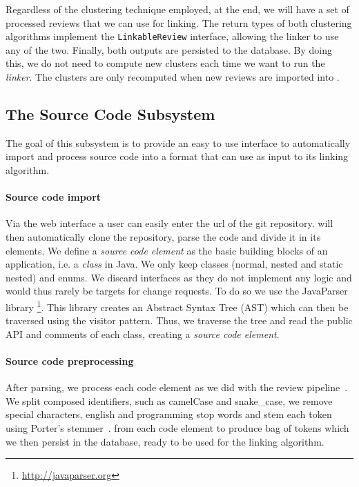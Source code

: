 Regardless of the clustering technique employed, at the end, we will have a set of processed reviews that we can use for linking. The return types of both clustering algorithms implement the \texttt{LinkableReview} interface, allowing the linker to use any of the two. Finally, both outputs are persisted to the database. By doing this, we do not need to compute new clusters each time we want to run the \textit{linker}. The clusters are only recomputed when new reviews are imported into \tool{}.

%
%
\subsection{The Source Code Subsystem}

The goal of this subsystem is to provide an easy to use interface to automatically import and process source code into a format that \tool{} can use as input to its linking algorithm. 
\paragraph{Source code import} 
Via the web interface a user can easily enter the url of the git repository. \tool{} will then automatically clone the repository, parse the code and divide it in its elements. We define a \textit{source code element} as the basic building blocks of an application, i.e. a \textit{class} in Java. We only keep classes (normal, nested and static nested) and enums. We discard interfaces as they do not implement any logic and would thus rarely be targets for change requests. To do so we use the JavaParser library \footnote{\url{http://javaparser.org}}. This library creates an Abstract Syntax Tree (AST) which can then be traversed using the visitor pattern. Thus, we traverse the tree and read the public API and comments of each class, creating a \textit{source code element}.

\paragraph{Source code preprocessing}
After parsing, we process each code element as we did with the review pipeline~\cite{Palomba2017,BaezaYates:1999}.
We split composed identifiers, such as camelCase and snake\_case, we remove special characters, english and programming stop words and stem each token using Porter's stemmer~\cite{porter1980algorithm}. from each code element to produce bag of tokens which we then persist in the database, ready to be used for the linking algorithm. 

